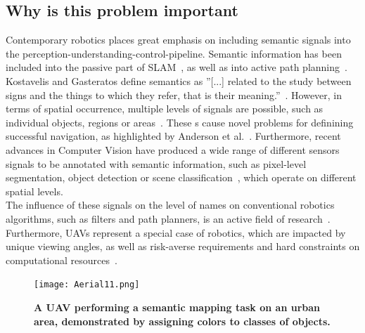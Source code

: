 \documentclass[twocolumn,letterpaper]{IEEEAerospaceCLS}  %
\begin{document}
\subsection{Why is this problem important}
Contemporary robotics places great emphasis on including semantic signals into the perception-understanding-control-pipeline. Semantic information has been included into the passive part of SLAM~\cite{cadena_past_2016,zhang_hierarchical_2019}, as well as into active path planning~\cite{koch_automatic_2019,alirezaie_exploiting_2017}. Kostavelis and Gasteratos define semantics as ''[...] related to the study between signs and the things to which they refer, that is their meaning.''~\cite{kostavelis_semantic_2015}. However, in terms of spatial occurrence, multiple levels of signals are possible, such as individual objects, regions or areas~\cite{kostavelis_semantic_2015}. These s cause novel problems for definining successful navigation, as highlighted by Anderson et al.~\cite{anderson_evaluation_2018}. Furthermore, recent advances in Computer Vision have produced a wide range of different sensors signals to be annotated with semantic information, such as pixel-level segmentation, object detection or scene classification~\cite{alom_history_2018}, which operate on different spatial levels.\\
The influence of these signals on the level of names on conventional robotics algorithms, such as filters and path planners, is an active field of research~\cite{kostavelis_semantic_2015,cadena_past_2016,anderson_evaluation_2018}. Furthermore, UAVs represent a special case of robotics, which are impacted by unique viewing angles, as well as risk-averse requirements and hard constraints on computational resources~\cite{mandel_method_2020,gonzalez_unmanned_2016}.
\begin{figure}
    \centering
    \texttt{[image: Aerial11.png]}\\
    \caption{\bf{A UAV performing a semantic mapping task on an urban area, demonstrated by assigning colors to classes of objects.}}
    \label{fig:AerialImg}
\end{figure}
\end{document}
